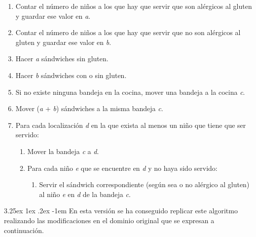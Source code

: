 \documentclass{article}
\makeatletter
\renewcommand\paragraph{\@startsection{paragraph}{5}{\z@}%
      {3.25ex \@plus1ex \@minus.2ex}%
      {-1em}%
      {\normalfont\normalsize\bfseries}}
\makeatother
\begin{document}
    \begin{enumerate}
        \item Contar el número de niños a los que hay que servir que son alérgicos al gluten y guardar ese valor en \textit{a}.
        \item Contar el número de niños a los que hay que servir que no son alérgicos al gluten y guardar ese valor en \textit{b}.
        \item Hacer \textit{a} sándwiches sin gluten.
        \item Hacer \textit{b} sándwiches con o sin gluten.
        \item Si no existe ninguna bandeja en la cocina, mover una bandeja a la cocina \textit{c}.
        \item Mover (\textit{a} + \textit{b}) sándwiches a la misma bandeja \textit{c}.
        \item Para cada localización \textit{d} en la que exista al menos un niño que tiene que ser servido:
        \begin{enumerate}
            \item Mover la bandeja \textit{c} a \textit{d}.
            \item Para cada niño \textit{e} que se encuentre en \textit{d} y no haya sido servido:
            \begin{enumerate}
                \item Servir el sándwich correspondiente (según sea o no alérgico al gluten) al niño \textit{e} en \textit{d} de la bandeja \textit{c}. 
            \end{enumerate}
        \end{enumerate}
    \end{enumerate}
    
    \paragraph{}
    En esta versión se ha conseguido replicar este algoritmo realizando las modificaciones en el dominio original que se expresan a continuación.
    
\end{document}
